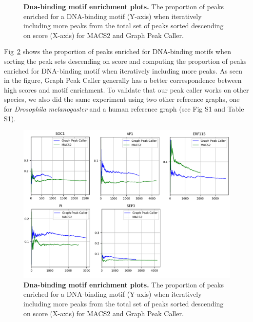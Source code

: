 \documentclass[10pt,letterpaper]{article}
\begin{document}
\begin{figure}[!h]
 \caption{{\bf Dna-binding motif enrichment plots.} The proportion of peaks enriched for a DNA-binding motif (Y-axis) when iteratively including more peaks from the total set of peaks sorted descending on score (X-axis) for MACS2 and Graph Peak Caller. }
\label{motif_enrichment_reads}
\end{figure}


Fig~\ref{motif_plots} shows the proportion of peaks enriched for DNA-binding motifs when sorting the peak sets descending on score and computing the proportion of peaks enriched for DNA-binding motif when iteratively including more peaks. As seen in the figure, Graph Peak Caller generally has a better correspondence between high scores and motif enrichment. To validate that our peak caller works on other species, we also did the same experiment using two other reference graphs, one for \emph{Drosophila melanogaster } and a human reference graph (see Fig S1 and Table S1).


\begin{figure}[!h]
 \includegraphics[width=1.0\textwidth]{figures/Fig4.png}
 \caption{{\bf Dna-binding motif enrichment plots.} The proportion of peaks enriched for a DNA-binding motif (Y-axis) when iteratively including more peaks from the total set of peaks sorted descending on score (X-axis) for MACS2 and Graph Peak Caller. }
\label{motif_plots}
\end{figure}
\end{document}
